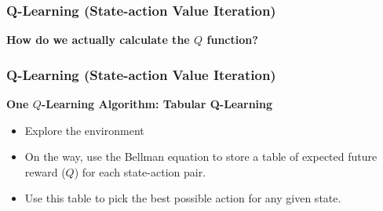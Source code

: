 \begin{frame}
\frametitle{Q-Learning (State-action Value Iteration)}
  \begin{center}
    \textbf{How do we actually calculate the $Q$ function?}
  \end{center}
\end{frame}

\begin{frame}
\frametitle{Q-Learning (State-action Value Iteration)}
  \textbf{One $Q$-Learning Algorithm: Tabular Q-Learning}
  \begin{itemize}
    \item Explore the environment
    \item On the way, use the Bellman equation to store a table of expected future reward ($Q$) for each state-action pair.
    \item Use this table to pick the best possible action for any given state.
  \end{itemize}
\end{frame}

